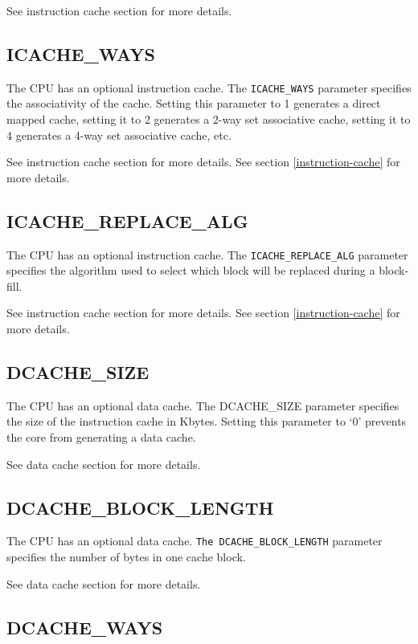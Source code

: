 See instruction cache section for more details.

\subsection{ICACHE\_WAYS}\label{icache_ways}

The CPU has an optional instruction cache. The \texttt{ICACHE\_WAYS} parameter
specifies the associativity of the cache. Setting this parameter to 1
generates a direct mapped cache, setting it to 2 generates a 2-way set
associative cache, setting it to 4 generates a 4-way set associative
cache, etc.

See instruction cache section for more details.
See section \ref{instruction-cache}  for more details.

\subsection{ICACHE\_REPLACE\_ALG}\label{icache_replace_alg}

The CPU has an optional instruction cache. The \texttt{ICACHE\_REPLACE\_ALG}
parameter specifies the algorithm used to select which block will be
replaced during a block-fill.

See instruction cache section for more details.
See section \ref{instruction-cache}  for more details.

\subsection{DCACHE\_SIZE}\label{dcache_size}

The CPU has an optional data cache. The DCACHE\_SIZE parameter specifies
the size of the instruction cache in Kbytes. Setting this parameter to
`0' prevents the core from generating a data cache.

See data cache section for more details.

\subsection{DCACHE\_BLOCK\_LENGTH}\label{dcache_block_length}

The CPU has an optional data cache. \texttt{The DCACHE\_BLOCK\_LENGTH} parameter
specifies the number of bytes in one cache block.

See data cache section for more details.

\subsection{DCACHE\_WAYS}\label{dcache_ways}

